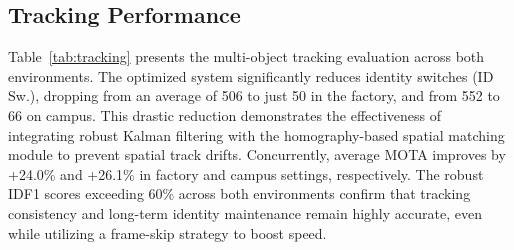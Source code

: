 \subsection{Tracking Performance}
\label{subsec:tracking-results}

Table~\ref{tab:tracking} presents the multi-object tracking evaluation across both environments. The optimized system significantly reduces identity switches (ID Sw.), dropping from an average of 506 to just 50 in the factory, and from 552 to 66 on campus. This drastic reduction demonstrates the effectiveness of integrating robust Kalman filtering with the homography-based spatial matching module to prevent spatial track drifts. Concurrently, average MOTA improves by +24.0\% and +26.1\% in factory and campus settings, respectively. The robust IDF1 scores exceeding 60\% across both environments confirm that tracking consistency and long-term identity maintenance remain highly accurate, even while utilizing a frame-skip strategy to boost speed.

